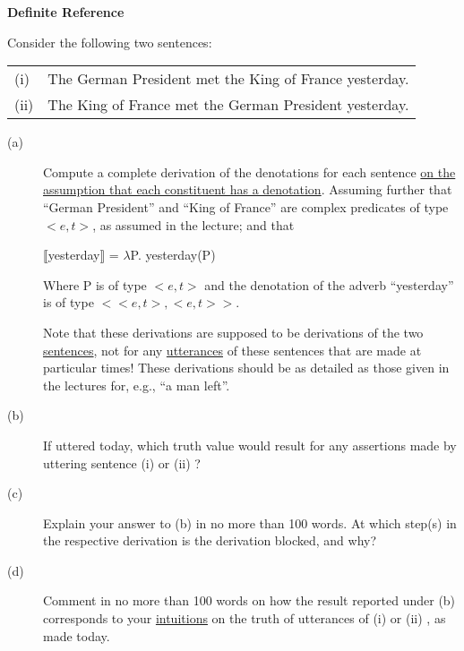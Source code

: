 \documentclass[11pt]{article}
\begin{document}
\begin{problem}{4}
\textbf{Definite Reference}

Consider the following two sentences:

\begin{tabular}{l l}
(i) & The German President met the King of France yesterday. \\
(ii) & The King of France met the German President yesterday. \\
\end{tabular}

\begin{description}
    \item[(a)] Compute a complete derivation of the denotations for each sentence \uline{on the assumption that each constituent has a denotation}. Assuming further that ``German President'' and ``King of France'' are complex predicates of type $<e,t>$, as assumed in the lecture; and that 

    \begin{center}
    $\llbracket$yesterday$\rrbracket$ = $\lambda$P. yesterday(P) 
    \end{center}

    Where P is of type $<e,t>$ and the denotation of the adverb ``yesterday'' is of type $<<e,t>,<e,t>>$.

    Note that these derivations are supposed to be derivations of the two \uline{sentences}, not for any \uline{utterances} of these sentences that are made at particular times!  These derivations should be as detailed as those given in the lectures for, e.g., ``a man left''.

    \item[(b)] If uttered today, which truth value would result for any assertions made by uttering sentence (i) or (ii) ?
    \item[(c)] Explain your answer to (b) in no more than 100 words. At which step(s) in the respective derivation is the derivation blocked, and why?
    \item[(d)] Comment in no more than 100 words on how the result reported under (b) corresponds
to your \uline{intuitions} on the truth of utterances of (i) or (ii) , as made today.
    
\end{description}

\end{problem}
\end{document}
